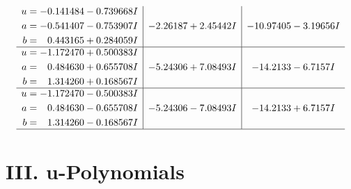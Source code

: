\documentclass[1p]{elsarticle_modified}
\theoremstyle{definition}
\begin{document}
$$\begin{array}{c|c|c}
\begin{aligned}
u &= -0.141484 - 0.739668 I \\
a &= -0.541407 - 0.753907 I \\
b &= \phantom{-}0.443165 + 0.284059 I\end{aligned}
 & -2.26187 + 2.45442 I & -10.97405 - 3.19656 I \\ \hline\begin{aligned}
u &= -1.172470 + 0.500383 I \\
a &= \phantom{-}0.484630 + 0.655708 I \\
b &= \phantom{-}1.314260 + 0.168567 I\end{aligned}
 & -5.24306 + 7.08493 I & -14.2133 - 6.7157 I \\ \hline\begin{aligned}
u &= -1.172470 - 0.500383 I \\
a &= \phantom{-}0.484630 - 0.655708 I \\
b &= \phantom{-}1.314260 - 0.168567 I\end{aligned}
 & -5.24306 - 7.08493 I & -14.2133 + 6.7157 I\\
 \hline 
 \end{array}$$\newpage
\newpage\renewcommand{\arraystretch}{1}
\centering \section*{ III. u-Polynomials}
\end{document}

